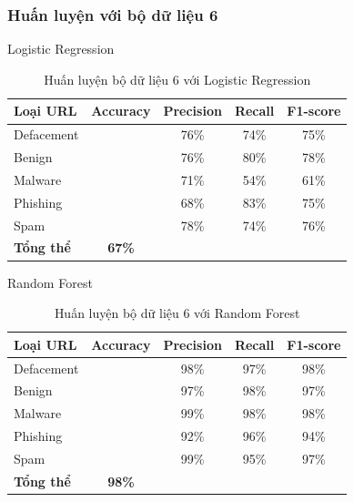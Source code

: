 \documentclass[13pt]{article}
\begin{document}
\subsubsection{Huấn luyện với bộ dữ liệu 6}

Logistic Regression
\newpage
\begin{table}[h]
    \centering
    \renewcommand{\arraystretch}{1.3} %
    \begin{tabular}{|l|c|c|c|c|}
        \hline
        \rowcolor[HTML]{C0C0C0} %
        \textbf{Loại URL} & \textbf{Accuracy} & \textbf{Precision} & \textbf{Recall} & \textbf{F1-score} \\ 
        \hline
        Defacement &  & 76\% & 74\% & 75\% \\ 
        \hline
        Benign &  & 76\% & 80\% & 78\% \\ 
        \hline
        Malware &  & 71\% & 54\% & 61\% \\ 
        \hline
        Phishing &  & 68\% & 83\% & 75\% \\ 
        \hline
        Spam &  & 78\% & 74\% & 76\% \\ 
        \hline
        \textbf{Tổng thể} & \textbf{67\%} &  &  &  \\ 
        \hline
    \end{tabular}
    \caption{Huấn luyện bộ dữ liệu 6 với Logistic Regression}
    \label{tab:logistic_regression}
\end{table}

Random Forest
\begin{table}[h]
    \centering
    \renewcommand{\arraystretch}{1.3} %
    \begin{tabular}{|l|c|c|c|c|}
        \hline
        \rowcolor[HTML]{C0C0C0} %
        \textbf{Loại URL} & \textbf{Accuracy} & \textbf{Precision} & \textbf{Recall} & \textbf{F1-score} \\ 
        \hline
        Defacement &  & 98\% & 97\% & 98\% \\ 
        \hline
        Benign &  & 97\% & 98\% & 97\% \\ 
        \hline
        Malware &  & 99\% & 98\% & 98\% \\ 
        \hline
        Phishing &  & 92\% & 96\% & 94\% \\ 
        \hline
        Spam &  & 99\% & 95\% & 97\% \\ 
        \hline
        \textbf{Tổng thể} & \textbf{98\%} &  &  &  \\ 
        \hline
    \end{tabular}
    \caption{Huấn luyện bộ dữ liệu 6 với Random Forest}
    \label{tab:logistic_regression}
\end{table}
\end{document}
